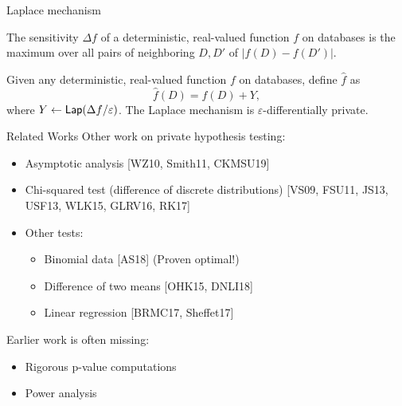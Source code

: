 \documentclass{beamer}
\newcommand{\lap}{\ensuremath{{\sf Lap}}\xspace}
\begin{document}
\begin{frame}{Laplace mechanism}
\begin{definition}[Sensitivity]
The sensitivity $\Delta f$ of a deterministic, real-valued function $f$ on databases is the maximum over all pairs of neighboring $D, D'$ of $| f(D) - f(D') |$.
\end{definition}

\pause
\begin{theorem}
Given any deterministic, real-valued function $f$ on databases, define $\widehat{f}$ as
$$\widehat{f}(D) = f(D) + Y,$$
where $Y \leftarrow \lap(\Delta f/\varepsilon)$. The Laplace mechanism is $\varepsilon$-differentially private.
\end{theorem}
\end{frame}

\begin{frame}{Related Works}
    Other work on private hypothesis testing:\pause
\begin{itemize}
\item Asymptotic analysis [WZ10, Smith11, CKMSU19] \pause
\item Chi-squared test (difference of discrete distributions) [VS09, FSU11, JS13, USF13, WLK15, GLRV16, RK17] \pause
\item Other tests: \pause
\begin{itemize}
\item Binomial data [AS18] (Proven optimal!) \pause
\item Difference of two means [OHK15, DNLI18] \pause
\item Linear regression [BRMC17, Sheffet17] \pause
\end{itemize}
\end{itemize}
Earlier work is often missing: \pause
\begin{itemize}
\item Rigorous p-value computations \pause
\item Power analysis
\end{itemize}
\end{frame}
\end{document}

